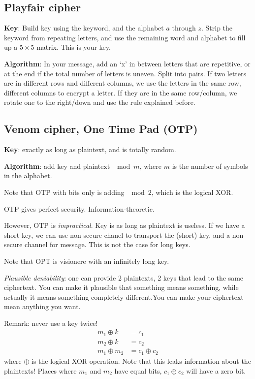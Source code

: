 \documentclass[language=english,number=]{homework}
\begin{document}
\subsection{Playfair cipher}

\textbf{Key}: Build key using the keyword, and the alphabet $a$ through $z$.
Strip the keyword from repeating letters, and use the remaining word and alphabet to fill up a $5 \times 5$ matrix.
This is your key.

\textbf{Algorithm}: In your message, add an `x' in between letters that are repetitive, or at the end if the total number of letters is uneven.
Split into pairs.
If two letters are in different rows and different columns, we use the letters in the same row, different columns to encrypt a letter.
If they are in the same row/column, we rotate one to the right/down and use the rule explained before.

\subsection{Venom cipher, One Time Pad (OTP)}

\textbf{Key}: exactly as long as plaintext, and is totally random.

\textbf{Algorithm}: add key and plaintext $\mod m$, where $m$ is the number of symbols in the alphabet.

Note that OTP with bits only is adding $\mod 2$, which is the logical XOR.

\begin{theorem}[Shannon]
OTP gives perfect security.
Information-theoretic.
\end{theorem}

However, OTP is \textit{impractical}.
Key is as long as plaintext is useless.
If we have a short key, we can use non-secure chanel to transport the (short) key, and a non-secure channel for message.
This is not the case for long keys.

Note that OPT is visionere with an infinitely long key.

\textit{Plausible deniability}: one can provide 2 plaintexts, 2 keys that lead to the same ciphertext.
You can make it plausible that something means something, while actually it means something completely different.You can make your ciphertext mean anything you want.

Remark: never use a key twice!
\begin{align*}
m_1 \oplus k &= c_1 \\
m_2 \oplus k &= c_2 \\
m_1 \oplus m_2 &= c_1 \oplus c_2
\end{align*}
where $\oplus$ is the logical XOR operation.
Note that this leaks information about the plaintexts!
Places where $m_1$ and $m_2$ have equal bits, $c_1 \oplus c_2$ will have a zero bit.
\end{document}
